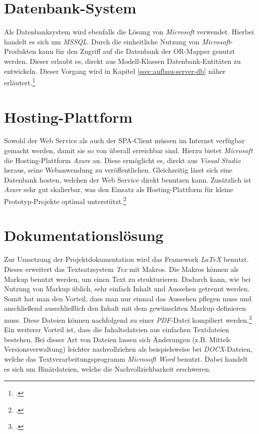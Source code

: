 \section{Datenbank-System}
\label{sec:DB-System}
Als Datenbanksystem wird ebenfalls die Lösung von \textit{Microsoft} verwendet. Hierbei handelt es sich um \textit{\ac{MSSQL}}. Durch die einheitliche Nutzung von \textit{Microsoft}-Produkten kann für den Zugriff auf die Datenbank der \ac{OR-Mapper} genutzt werden. Dieser erlaubt es, direkt aus Modell-Klassen Datenbank-Entitäten zu entwickeln. Dieser Vorgang wird in Kapitel \ref{ssec:aufbau-server-db} näher erläutert.\footcite{online:SQLServer}
\section{Hosting-Plattform}
\label{sec:Hosting-Plattform}
Sowohl der Web Service als auch der \ac{SPA}-Client müssen im Internet verfügbar gemacht werden, damit sie so von überall erreichbar sind. Hierzu bietet \textit{Microsoft} die Hosting-Plattform \textit{Azure} an. Diese ermöglicht es, direkt aus \textit{\ac{Visual Studio}} heraus, seine Webanwendung zu veröffentlichen. Gleichzeitig lässt sich eine Datenbank hosten, welchen der Web Service direkt benutzen kann. Zusätzlich ist \textit{Azure} sehr gut skalierbar, was den Einsatz als Hosting-Plattform für kleine Prototyp-Projekte optimal unterstützt.\footcite{online:Azure}
\section{Dokumentationslösung}
\label{sec:dokumentationslösung}
Zur Umsetzung der Projektdokumentation wird das Framework \textit{LaTeX} benutzt. Dieses erweitert das Textsatzsystem \textit{Tex} mit \glspl{Makro}. Die \glspl{Makro} können als \gls{Markup} benutzt werden, um einen Text zu strukturieren. Dadurch kann, wie bei Nutzung von \gls{Markup} üblich, sehr einfach Inhalt und Aussehen getrennt werden. Somit hat man den Vorteil, dass man nur einmal das Aussehen pflegen muss und anschließend ausschließlich den Inhalt mit dem gewünschten \gls{Markup} definieren muss. Diese Dateien können nachfolgend zu einer \textit{PDF}-Datei kompiliert werden.\footcite{online:definition-latex}\\ 
Ein weiterer Vorteil ist, dass die Inhaltsdateien aus einfachen Textdateien bestehen. Bei dieser Art von Dateien lassen sich Änderungen (z.B. Mittels Versionsverwaltung) leichter nachvollziehen als beispielsweise bei \textit{DOCX}-Dateien, welche das Textverarbeitungsprogramm \textit{Microsoft Word} benutzt. Dabei handelt es sich um Binärdateien, welche die Nachvollziehbarkeit erschweren.
